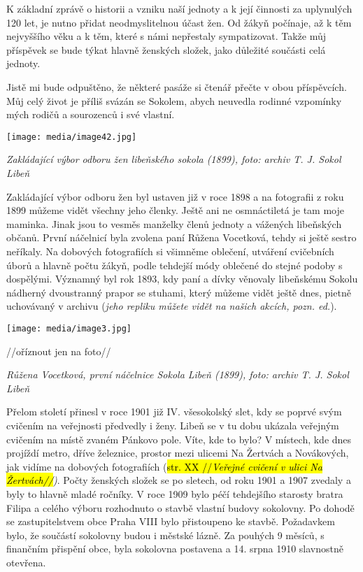 K základní zprávě o historii a vzniku naší jednoty a k její činnosti za
uplynulých 120 let, je nutno přidat neodmyslitelnou účast žen. Od žákyň
počínaje, až k těm nejvyššího věku a k těm, které s námi nepřestaly
sympatizovat. Takže můj příspěvek se bude týkat hlavně ženských složek,
jako důležité součásti celá jednoty.

Jistě mi bude odpuštěno, že některé pasáže si čtenář přečte v obou
příspěvcích. Můj celý život je příliš svázán se Sokolem, abych neuvedla
rodinné vzpomínky mých rodičů a sourozenců i své vlastní.

\texttt{[image: media/image42.jpg]}

\emph{Zakládající výbor odboru žen libeňského sokola (1899), foto:
archiv T. J. Sokol Libeň}

Zakládající výbor odboru žen byl ustaven již v roce 1898 a na fotografii
z roku 1899 můžeme vidět všechny jeho členky. Ještě ani ne osmnáctiletá
je tam moje maminka. Jinak jsou to vesměs manželky členů jednoty a
vážených libeňských občanů. První náčelnicí byla zvolena paní Růžena
Vocetková, tehdy si ještě sestro neříkaly. Na dobových fotografiích si
všimněme oblečení, utváření cvičebních úborů a hlavně počtu žákyň, podle
tehdejší módy oblečené do stejné podoby s dospělými. Významný byl rok
1893, kdy paní a dívky věnovaly libeňskému Sokolu nádherný dvoustranný
prapor se stuhami, který můžeme vidět ještě dnes, pietně uchovávaný v
archivu (\emph{jeho repliku můžete vidět na našich akcích, pozn. ed.}).

\texttt{[image: media/image3.jpg]}

//oříznout jen na foto//

\emph{Růžena Vocetková, první náčelnice Sokola Libeň (1899), foto:
archiv T. J. Sokol Libeň}

Přelom století přinesl v roce 1901 již IV. všesokolský slet, kdy se
poprvé svým cvičením na veřejnosti předvedly i ženy. Libeň se v tu dobu
ukázala veřejným cvičením na místě zvaném Pánkovo pole. Víte, kde to
bylo? V místech, kde dnes projíždí metro, dříve železnice, prostor mezi
ulicemi Na Žertvách a Novákových, jak vidíme na dobových fotografiích
(\hl{str. XX //\emph{Veřejné cvičení v ulici Na Žertvách//}}\emph{)}.
Počty ženských složek se po sletech, od roku 1901 a 1907 zvedaly a byly
to hlavně mladé ročníky. V roce 1909 bylo péčí tehdejšího starosty
bratra Filipa a celého výboru rozhodnuto o stavbě vlastní budovy
sokolovny. Po dohodě se zastupitelstvem obce Praha VIII bylo přistoupeno
ke stavbě. Požadavkem bylo, že součástí sokolovny budou i městské lázně.
Za pouhých 9 měsíců, s finančním přispění obce, byla sokolovna postavena
a 14. srpna 1910 slavnostně otevřena.

